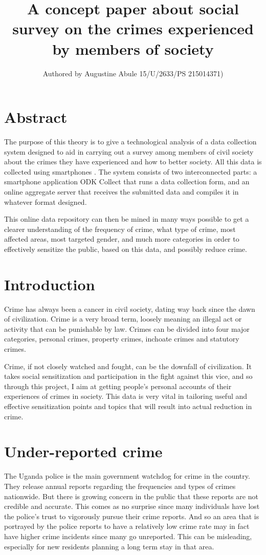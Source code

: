 \documentclass{article}
\title{A concept paper about social survey on the crimes experienced by members of society }
\author{Authored by Augustine Abule 15/U/2633/PS 215014371)}
\date{}
\begin{document}
\maketitle
\section{Abstract}
The purpose of this theory is to give a technological analysis of a data collection system designed to aid in carrying out 
a survey among members of civil society about the crimes they have experienced and how to better society. All this data is collected using smartphones \cite{key:1}. 
The system consists of two interconnected parts: a smartphone application ODK Collect \cite{key:2} that runs a data collection form, and an online aggregate
 server that receives the submitted data and compiles it in whatever format designed. 

This online data repository can then be mined in many ways possible to get a clearer understanding of the frequency of crime,
 what type of crime, most affected areas, most targeted gender, and much more categories in order to effectively sensitize the public, 
based on this data, and possibly reduce crime.

\section{Introduction}
Crime \cite{key:3} has always been a cancer in civil society, dating way back since the dawn of civilization. 
Crime is a very broad term, loosely meaning an illegal act or activity that can be punishable by law. Crimes can be divided into four major categories, personal crimes, property crimes, inchoate crimes and statutory crimes.

Crime, if not closely watched and fought, can be the downfall of civilization. It takes social sensitization and participation in the fight against this vice, and so through this project, I aim at getting people's personal accounts of their experiences of crimes in society. This data is very vital in tailoring useful and effective sensitization points and topics that will result into actual reduction in crime.

\section{Under-reported crime}
The Uganda police is the main government watchdog for crime in the country. They release annual reports regarding the frequencies 
and types of crimes nationwide. But there is growing concern in the public that these reports are not credible and accurate. 
This comes as no surprise since many individuals have lost the police’s trust to vigorously pursue their crime reports. 
And so an area that is portrayed by the police reports to have a relatively low crime rate may in fact have higher crime incidents since many go unreported.
 This can be misleading, especially for new residents planning a long term stay in that area.
\end{document}
